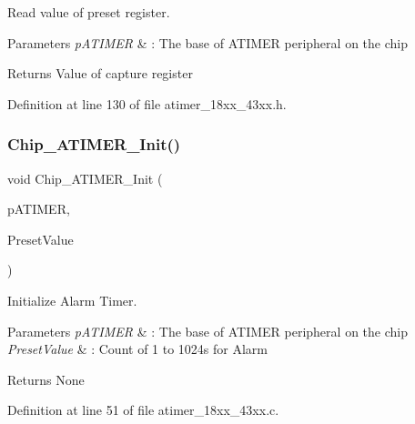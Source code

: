 Read value of preset register. 


\begin{DoxyParams}{Parameters}
{\em p\+A\+T\+I\+M\+ER} & \+: The base of A\+T\+I\+M\+ER peripheral on the chip \\
\hline
\end{DoxyParams}
\begin{DoxyReturn}{Returns}
Value of capture register 
\end{DoxyReturn}


Definition at line 130 of file atimer\+\_\+18xx\+\_\+43xx.\+h.

\mbox{\label{group___a_t_i_m_e_r__18_x_x__43_x_x_ga0d20b10ad91803e126b2a85c4881a95c}} 
\subsubsection{\texorpdfstring{Chip\+\_\+\+A\+T\+I\+M\+E\+R\+\_\+\+Init()}{Chip\_ATIMER\_Init()}}
{\footnotesize\ttfamily void Chip\+\_\+\+A\+T\+I\+M\+E\+R\+\_\+\+Init (\begin{DoxyParamCaption}\item[{\hyperlink{struct_l_p_c___a_t_i_m_e_r___t}{L\+P\+C\+\_\+\+A\+T\+I\+M\+E\+R\+\_\+T} $\ast$}]{p\+A\+T\+I\+M\+ER,  }\item[{uint32\+\_\+t}]{Preset\+Value }\end{DoxyParamCaption})}



Initialize Alarm Timer. 


\begin{DoxyParams}{Parameters}
{\em p\+A\+T\+I\+M\+ER} & \+: The base of A\+T\+I\+M\+ER peripheral on the chip \\
\hline
{\em Preset\+Value} & \+: Count of 1 to 1024s for Alarm \\
\hline
\end{DoxyParams}
\begin{DoxyReturn}{Returns}
None 
\end{DoxyReturn}


Definition at line 51 of file atimer\+\_\+18xx\+\_\+43xx.\+c.

